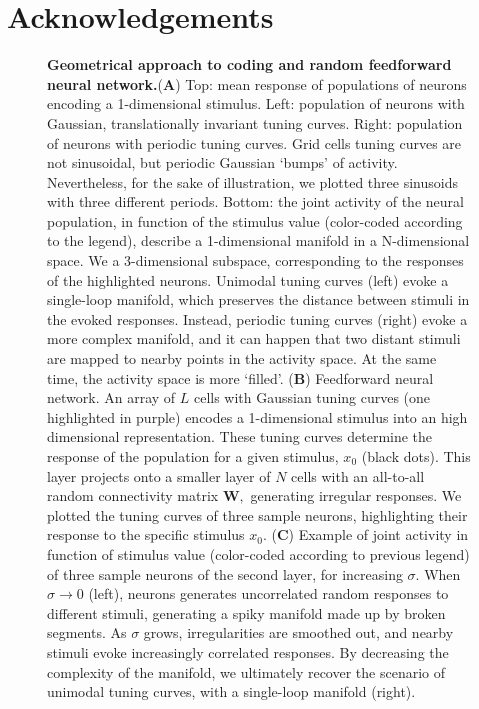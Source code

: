 \documentclass[a4paper]{article}
\begin{document}
\section{Acknowledgements}



\newpage
\begin{figure}
\centering
{}
\caption{\textbf{Geometrical approach to coding and random feedforward neural network.}(\textbf{A}) Top: mean response of populations of  neurons encoding a 1-dimensional stimulus. Left: population of neurons with Gaussian, translationally invariant tuning curves. Right: population of neurons with periodic tuning curves. Grid cells tuning curves are not sinusoidal, but periodic Gaussian `bumps' of activity. Nevertheless, for the sake of illustration, we plotted three sinusoids with three different periods.
Bottom: the joint activity of the neural population, in function of the stimulus value (color-coded according to the legend), describe a 1-dimensional manifold in a N-dimensional space. We a 3-dimensional subspace, corresponding to the responses of the highlighted neurons. Unimodal tuning curves (left) evoke a single-loop manifold, which preserves the distance between stimuli in the evoked responses.  Instead, periodic tuning curves (right) evoke a more complex manifold, and it can happen that two distant stimuli are mapped to nearby points in the activity space. At the same time, the activity space is more `filled'.
 (\textbf{B}) Feedforward neural network. An array of $L$ cells with Gaussian tuning curves (one highlighted in purple) encodes a 1-dimensional stimulus into an high dimensional representation.  These tuning curves determine the response of the population for a given stimulus, $x_0$ (black dots). This layer  projects onto a smaller layer of $N$ cells with an all-to-all random connectivity matrix $\mathbf{W},$ generating irregular responses. We plotted the tuning curves of three sample neurons, highlighting their response to the specific stimulus $x_0$. 
(\textbf{C}) Example of joint activity in function of stimulus value (color-coded according to previous legend) of three sample neurons of the second layer, for increasing $\sigma$.   When  $\sigma \rightarrow 0$ (left), neurons generates uncorrelated random responses to different stimuli, generating a spiky manifold made up by broken segments. As $\sigma$ grows, irregularities are smoothed out, and nearby stimuli evoke increasingly correlated responses. By decreasing the complexity of the manifold, we ultimately recover the scenario of unimodal tuning curves, with a single-loop manifold (right).}
\label{Fig:1}
\end{figure}
\end{document}
